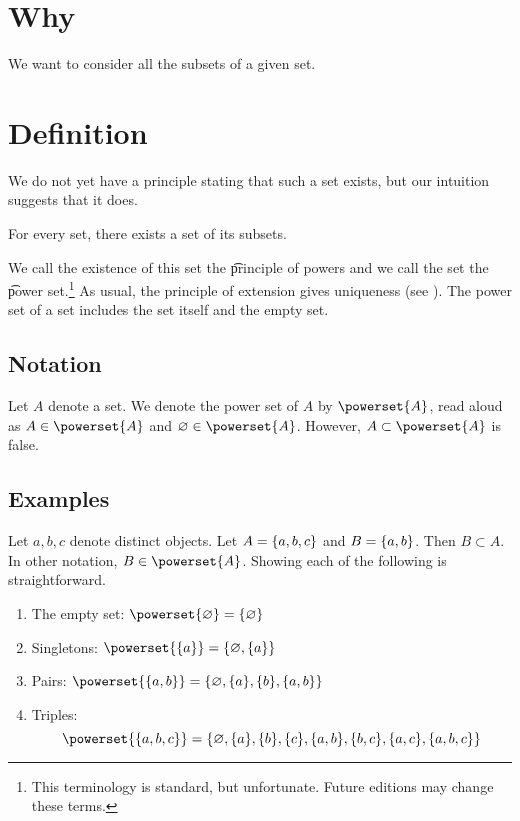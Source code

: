 

\section*{Why}

We want to consider all the subsets of a given set.

\section*{Definition}

We do not yet have a principle stating that such a set exists, but our intuition suggests that it does.

\begin{principle}[powers]
For every set, there exists a set of its subsets.\end{principle}
We call the existence of this set the \t{principle of powers} and we call the set the \t{power set}.\footnote{This terminology is standard, but unfortunate. Future editions may change these terms.}
As usual, the principle of extension gives uniqueness (see ).
The power set of a set includes the set itself and the empty set.

\subsection*{Notation}

Let $A$ denote a set.
We denote the power set of $A$ by $\powerset{A}$, read aloud as 
$A \in \powerset{A}$ and $\emptyset \in \powerset{A}$.
However, $A \subset \powerset{A}$ is false.

\subsection*{Examples}

Let $a, b, c$ denote distinct objects. Let $A = \{a, b ,c\}$
and $B = \{a, b\}$. Then
$B \subset A$.
In other notation,
$B \in \powerset{A}$.
Showing each of the following is straightforward.
  \begin{enumerate}
    \item The empty set: $\powerset{\varnothing} = \set{\varnothing}$
    \item Singletons: $\powerset{\set{a}} = \set{\varnothing, \set{a}}$
    \item Pairs: $\powerset{\set{a, b}} = \set{\varnothing, \set{a}, \set{b}, \set{a, b}}$
    \item Triples:
      \[
\powerset{\set{a, b, c}} =
\{
\emptyset,
\set{a},
\set{b},
\set{c},
\set{a, b},
\set{b, c},
\set{a, c},
\set{a, b, c}
\}
      \]
  \end{enumerate}

